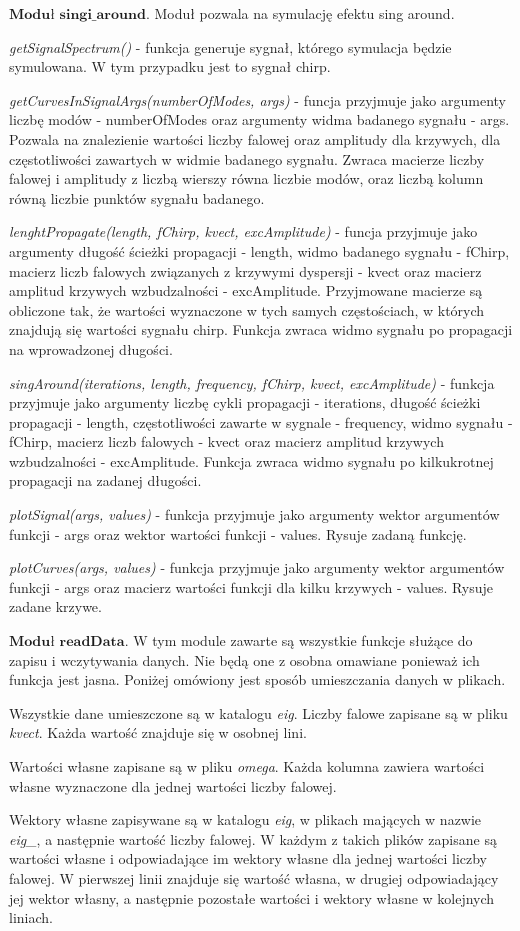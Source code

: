 \vspace {3mm}
 \( \textbf{Moduł singi\_around} \).
Moduł pozwala na symulację efektu sing around.

\vspace {3mm}
\textit{getSignalSpectrum()} - funkcja generuje sygnał, którego symulacja będzie symulowana. W tym przypadku jest to sygnał chirp.

\vspace {3mm}
\textit{getCurvesInSignalArgs(numberOfModes, args)} - funcja przyjmuje jako argumenty liczbę modów - numberOfModes oraz argumenty widma badanego sygnału - args. Pozwala na znalezienie wartości liczby falowej oraz amplitudy dla krzywych, dla częstotliwości zawartych w widmie badanego sygnału. Zwraca macierze liczby falowej i amplitudy z liczbą wierszy równa liczbie modów, oraz liczbą kolumn równą liczbie punktów sygnału badanego.

\vspace {3mm}
\textit{lenghtPropagate(length, fChirp, kvect, excAmplitude)} - funcja przyjmuje jako argumenty długość ścieżki propagacji - length, widmo badanego sygnału - fChirp, macierz liczb falowych związanych z krzywymi dyspersji - kvect oraz macierz amplitud krzywych wzbudzalności - excAmplitude. Przyjmowane macierze są obliczone tak, że wartości wyznaczone w tych samych częstościach, w których znajdują się wartości sygnału chirp. Funkcja zwraca widmo sygnału po propagacji na wprowadzonej długości.

\vspace {3mm}
\textit{singAround(iterations, length, frequency, fChirp, kvect, excAmplitude)} - funkcja przyjmuje jako argumenty liczbę cykli propagacji - iterations, długość ścieżki propagacji - length, częstotliwości zawarte w sygnale - frequency, widmo sygnału - fChirp, macierz liczb falowych - kvect oraz macierz amplitud krzywych wzbudzalności - excAmplitude. Funkcja zwraca widmo sygnału po kilkukrotnej propagacji na zadanej długości.

\vspace {3mm}
\textit{plotSignal(args, values)} - funkcja przyjmuje jako argumenty wektor argumentów funkcji - args oraz wektor wartości funkcji - values. Rysuje zadaną funkcję.

\vspace {3mm}
\textit{plotCurves(args, values)} - funkcja przyjmuje jako argumenty wektor argumentów funkcji - args oraz macierz wartości funkcji dla kilku krzywych - values. Rysuje zadane krzywe.

\vspace {3mm}
 \( \textbf{Moduł readData} \).
W tym module zawarte są wszystkie funkcje służące do zapisu i wczytywania danych. Nie będą one z osobna omawiane ponieważ ich funkcja jest jasna. Poniżej omówiony jest sposób umieszczania danych w plikach.

Wszystkie dane umieszczone są w katalogu \textit{eig}. Liczby falowe zapisane są w pliku \textit{kvect}. Każda wartość znajduje się w osobnej lini.

Wartości własne zapisane są w pliku \textit{omega}. Każda kolumna zawiera wartości własne wyznaczone dla jednej wartości liczby falowej.

Wektory własne zapisywane są w katalogu \textit{eig}, w plikach mających w nazwie \textit{eig\_}, a następnie wartość liczby falowej. W każdym z takich plików zapisane są wartości własne i odpowiadające im wektory własne dla jednej wartości liczby falowej. W pierwszej linii znajduje się wartość własna, w drugiej odpowiadający jej wektor własny, a następnie pozostałe wartości i wektory własne w kolejnych liniach.
